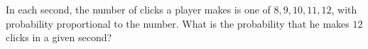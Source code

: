 In each second, the number of clicks a player makes is one of $8,9,10,11,12$, with probability proportional to the number. What is the probability that he makes $12$ clicks in a given second?
